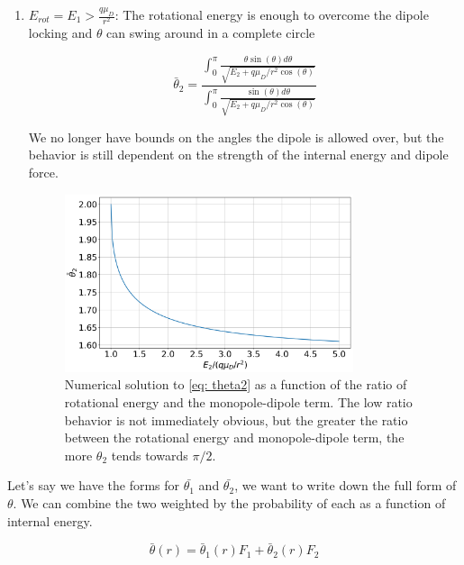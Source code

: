 \begin{enumerate}
	\item $E_{rot} = E_1 > \frac{q \mu_D}{r^2}$:
	The rotational energy is enough to overcome the dipole locking and $\theta$ can swing around in a complete circle

	\begin{equation}
	    \bar{\theta}_2  = \frac{\int_0^\pi \frac{\theta \sin(\theta) d\theta}{\sqrt{E_2 + q \mu_D/r^2 \cos(\theta)}}}{\int_0^\pi \frac{\sin(\theta) d \theta}{\sqrt{E_2 + q \mu_D/r^2 \cos(\theta)}}} \label{eq: theta2}
	\end{equation}

	We no longer have bounds on the angles the dipole is allowed over, but the behavior is still dependent on the strength of the internal energy and dipole force.

	\begin{figure}[H]
		\label{fig: theta2}
		\centering
		\includegraphics[width=0.8\textwidth]{images/ADO_theta2.png}
		\caption{Numerical solution to \cref{eq: theta2} as a function of the ratio of rotational energy and the monopole-dipole term. The low ratio behavior is not immediately obvious, but the greater the ratio between the rotational energy and monopole-dipole term, the more $\theta_2$ tends towards $\pi/2$.}
	\end{figure}

\end{enumerate}

Let's say we have the forms for $\bar{\theta_1}$ and $\bar{\theta_2}$, we want to write down the full form of $\theta$. We can combine the two weighted by the probability of each as a function of internal energy.

\begin{equation}
    \bar{\theta}(r) = \bar{\theta}_1(r) F_1 + \bar{\theta}_2(r) F_2 \label{eq: weighted theta}
\end{equation}

